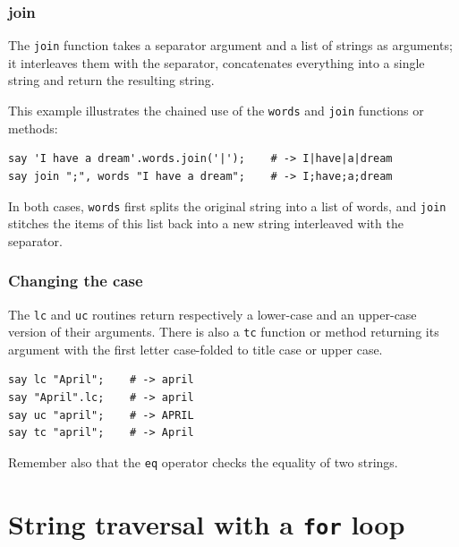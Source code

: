 \subsubsection{join}

The {\tt join} function takes a separator argument and a list 
of strings as arguments; it interleaves them with the separator, 
concatenates everything into a single string and return the 
resulting string.

This example illustrates the chained use of the {\tt words} and 
{\tt join} functions or methods:
\begin{verbatim}
say 'I have a dream'.words.join('|');    # -> I|have|a|dream
say join ";", words "I have a dream";    # -> I;have;a;dream
\end{verbatim}
%

In both cases, {\tt words} first splits the original 
string into a list of words, and {\tt join} stitches 
the items of this list back into a new string interleaved 
with the separator.  

\subsubsection{Changing the case}

The {\tt lc} and {\tt uc} routines return respectively a 
lower-case and an upper-case version of their arguments. 
There is also a {\tt tc} function or method returning its 
argument with the first letter case-folded to title case or 
upper case.

\begin{verbatim}
say lc "April";    # -> april
say "April".lc;    # -> april
say uc "april";    # -> APRIL
say tc "april";    # -> April
\end{verbatim}

Remember also that the {\tt eq} operator checks the equality 
of two strings. 

\section{String traversal with a {\tt for} loop}
\label{stringtraversal}

